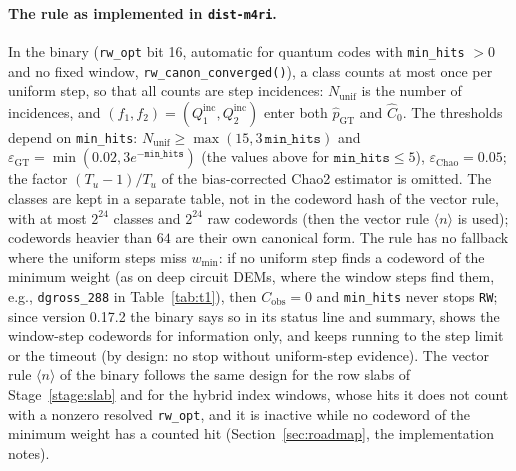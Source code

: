 \documentclass[12pt]{article}
\theoremstyle{definition}
\newcommand{\ttt}[1]{\texttt{#1}}
\begin{document}
\paragraph{The rule as implemented in \texorpdfstring{\ttt{dist-m4ri}}{dist-m4ri}.}
In the binary (\ttt{rw\_opt} bit 16, automatic for quantum codes with \ttt{min\_hits} $> 0$ and no fixed window,
\ttt{rw\_canon\_converged()}), a class counts at most once per uniform step, so that all counts are step incidences:
$N_{\mathrm{unif}}$ is the number of incidences, and $(f_1, f_2) = (Q_1^{\mathrm{inc}}, Q_2^{\mathrm{inc}})$ enter both
$\hat{p}_{\mathrm{GT}}$ and $\hat{C}_0$. The thresholds depend on \ttt{min\_hits}: $N_{\mathrm{unif}} \ge \max(15,
3\,\ttt{min\_hits})$ and $\varepsilon_{\mathrm{GT}} = \min(0.02, 3 e^{-\ttt{min\_hits}})$ (the values above for
$\ttt{min\_hits} \le 5$), $\varepsilon_{\mathrm{Chao}} = 0.05$; the factor $(T_u - 1)/T_u$ of the bias-corrected
Chao2 estimator is omitted. The classes are kept in a separate table, not in the codeword hash of the vector rule,
with at most $2^{24}$ classes and $2^{24}$ raw codewords (then the vector rule $\langle n \rangle$ is used); codewords
heavier than $64$ are their own canonical form. The rule has no fallback where the uniform steps miss $w_{\min}$: if
no uniform step finds a codeword of the minimum weight (as on deep circuit DEMs, where the window steps find them,
e.g., \ttt{dgross\_288} in Table~\ref{tab:t1}), then $C_{\mathrm{obs}} = 0$ and \ttt{min\_hits} never stops
\ttt{RW}; since version 0.17.2 the binary says so in its status line and summary, shows the window-step codewords for
information only, and keeps running to the step limit or the timeout (by design: no stop without uniform-step
evidence). The vector rule $\langle n \rangle$ of the binary follows the same design for the row slabs of
Stage~\ref{stage:slab} and for the hybrid index windows, whose hits it does not count with a nonzero resolved
\ttt{rw\_opt}, and it is inactive while no codeword of the minimum weight has a counted hit
(Section~\ref{sec:roadmap}, the implementation notes).
\end{document}
